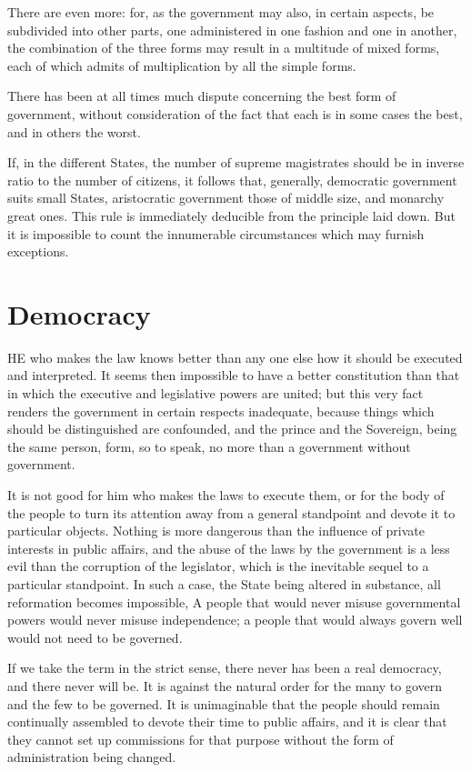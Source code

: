 \documentclass[12pt]{book}
\begin{document}
There are even more: for, as the government may also, in certain aspects, be subdivided into other parts, one administered in one fashion and one in another, the combination of the three forms may result in a multitude of mixed forms, each of which admits of multiplication by all the simple forms.

There has been at all times much dispute concerning the best form of government, without consideration of the fact that each is in some cases the best, and in others the worst.

If, in the different States, the number of supreme magistrates should be in inverse ratio to the number of citizens, it follows that, generally, democratic government suits small States, aristocratic government those of middle size, and monarchy great ones. This rule is immediately deducible from the principle laid down. But it is impossible to count the innumerable circumstances which may furnish exceptions.
\section{Democracy}
HE who makes the law knows better than any one else how it should be executed and interpreted. It seems then impossible to have a better constitution than that in which the executive and legislative powers are united; but this very fact renders the government in certain respects inadequate, because things which should be distinguished are confounded, and the prince and the Sovereign, being the same person, form, so to speak, no more than a government without government.

It is not good for him who makes the laws to execute them, or for the body of the people to turn its attention away from a general standpoint and devote it to particular objects. Nothing is more dangerous than the influence of private interests in public affairs, and the abuse of the laws by the government is a less evil than the corruption of the legislator, which is the inevitable sequel to a particular standpoint. In such a case, the State being altered in substance, all reformation becomes impossible, A people that would never misuse governmental powers would never misuse independence; a people that would always govern well would not need to be governed.

If we take the term in the strict sense, there never has been a real democracy, and there never will be. It is against the natural order for the many to govern and the few to be governed. It is unimaginable that the people should remain continually assembled to devote their time to public affairs, and it is clear that they cannot set up commissions for that purpose without the form of administration being changed.
\end{document}
